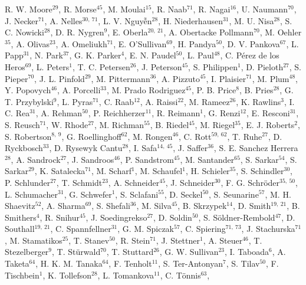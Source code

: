 \documentclass[a4paper,11pt]{article}
\begin{document}
R. W. Moore$^{29}$,
R. Morse$^{45}$,
M. Moulai$^{15}$,
R. Naab$^{71}$,
R. Nagai$^{16}$,
U. Naumann$^{70}$,
J. Necker$^{71}$,
A. Nelles$^{30,\: 71}$,
L. V. Nguy{\~{\^{{e}}}}n$^{28}$,
H. Niederhausen$^{31}$,
M. U. Nisa$^{28}$,
S. C. Nowicki$^{28}$,
D. R. Nygren$^{9}$,
E. Oberla$^{20,\: 21}$,
A. Obertacke Pollmann$^{70}$,
M. Oehler$^{35}$,
A. Olivas$^{23}$,
A. Omeliukh$^{71}$,
E. O'Sullivan$^{69}$,
H. Pandya$^{50}$,
D. V. Pankova$^{67}$,
L. Papp$^{31}$,
N. Park$^{37}$,
G. K. Parker$^{4}$,
E. N. Paudel$^{50}$,
L. Paul$^{48}$,
C. P{\'e}rez de los Heros$^{69}$,
L. Peters$^{1}$,
T. C. Petersen$^{26}$,
J. Peterson$^{45}$,
S. Philippen$^{1}$,
D. Pieloth$^{27}$,
S. Pieper$^{70}$,
J. L. Pinfold$^{29}$,
M. Pittermann$^{36}$,
A. Pizzuto$^{45}$,
I. Plaisier$^{71}$,
M. Plum$^{48}$,
Y. Popovych$^{46}$,
A. Porcelli$^{33}$,
M. Prado Rodriguez$^{45}$,
P. B. Price$^{8}$,
B. Pries$^{28}$,
G. T. Przybylski$^{9}$,
L. Pyras$^{71}$,
C. Raab$^{12}$,
A. Raissi$^{22}$,
M. Rameez$^{26}$,
K. Rawlins$^{3}$,
I. C. Rea$^{31}$,
A. Rehman$^{50}$,
P. Reichherzer$^{11}$,
R. Reimann$^{1}$,
G. Renzi$^{12}$,
E. Resconi$^{31}$,
S. Reusch$^{71}$,
W. Rhode$^{27}$,
M. Richman$^{55}$,
B. Riedel$^{45}$,
M. Riegel$^{35}$,
E. J. Roberts$^{2}$,
S. Robertson$^{8,\: 9}$,
G. Roellinghoff$^{62}$,
M. Rongen$^{46}$,
C. Rott$^{59,\: 62}$,
T. Ruhe$^{27}$,
D. Ryckbosch$^{33}$,
D. Rysewyk Cantu$^{28}$,
I. Safa$^{14,\: 45}$,
J. Saffer$^{36}$,
S. E. Sanchez Herrera$^{28}$,
A. Sandrock$^{27}$,
J. Sandroos$^{46}$,
P. Sandstrom$^{45}$,
M. Santander$^{65}$,
S. Sarkar$^{54}$,
S. Sarkar$^{29}$,
K. Satalecka$^{71}$,
M. Scharf$^{1}$,
M. Schaufel$^{1}$,
H. Schieler$^{35}$,
S. Schindler$^{30}$,
P. Schlunder$^{27}$,
T. Schmidt$^{23}$,
A. Schneider$^{45}$,
J. Schneider$^{30}$,
F. G. Schr{\"o}der$^{35,\: 50}$,
L. Schumacher$^{31}$,
G. Schwefer$^{1}$,
S. Sclafani$^{55}$,
D. Seckel$^{50}$,
S. Seunarine$^{57}$,
M. H. Shaevitz$^{52}$,
A. Sharma$^{69}$,
S. Shefali$^{36}$,
M. Silva$^{45}$,
B. Skrzypek$^{14}$,
D. Smith$^{19,\: 21}$,
B. Smithers$^{4}$,
R. Snihur$^{45}$,
J. Soedingrekso$^{27}$,
D. Soldin$^{50}$,
S. S{\"o}ldner-Rembold$^{47}$,
D. Southall$^{19,\: 21}$,
C. Spannfellner$^{31}$,
G. M. Spiczak$^{57}$,
C. Spiering$^{71,\: 73}$,
J. Stachurska$^{71}$,
M. Stamatikos$^{25}$,
T. Stanev$^{50}$,
R. Stein$^{71}$,
J. Stettner$^{1}$,
A. Steuer$^{46}$,
T. Stezelberger$^{9}$,
T. St{\"u}rwald$^{70}$,
T. Stuttard$^{26}$,
G. W. Sullivan$^{23}$,
I. Taboada$^{6}$,
A. Taketa$^{64}$,
H. K. M. Tanaka$^{64}$,
F. Tenholt$^{11}$,
S. Ter-Antonyan$^{7}$,
S. Tilav$^{50}$,
F. Tischbein$^{1}$,
K. Tollefson$^{28}$,
L. Tomankova$^{11}$,
C. T{\"o}nnis$^{63}$,
\end{document}
